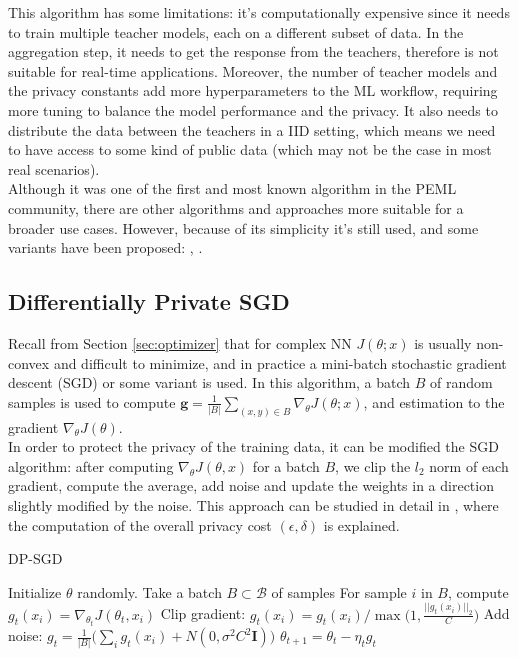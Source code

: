 This algorithm has some limitations: it's computationally expensive since it needs to train multiple teacher models, each on a different subset of data. In the aggregation step, it needs to get the response from the teachers, therefore is not suitable for real-time applications.
Moreover, the number of teacher models and the privacy constants add more hyperparameters to the ML workflow, requiring more tuning to balance the model performance and the privacy. It also needs to distribute the data between the teachers in a IID setting, which means we need to have access to some kind of public data (which may not be the case in most real scenarios).\\
Although it was one of the first and most known algorithm in the PEML community, there are other algorithms and approaches more suitable for a broader use cases. However, because of its simplicity it's still used, and some variants have been proposed: \cite{long}, \cite{jordon2019}.

\subsection{Differentially Private SGD}
Recall from Section \ref{sec:optimizer} that for complex NN $J(\theta; x)$ is usually non-convex and difficult to minimize, and in practice a mini-batch stochastic gradient descent (SGD) or some variant is used. In this algorithm, a batch $B$  of random samples is used to compute $\mathbf{g} = \frac{1}{|B|} \sum_{(x,y) \in B} \nabla_\theta J(\theta; x)$, and estimation to the gradient $\nabla_\theta J(\theta)$.\\
In order to protect the privacy of the training data, it can be modified the SGD algorithm: after computing $\nabla_\theta J(\theta, x)$ for a batch $B$, we clip the $l_2$ norm of each gradient, compute the average, add noise and update the weights in a direction slightly modified by the noise. This approach can be studied in detail in \cite{abadi2016}, where the computation of the overall privacy cost $(\epsilon, \delta)$ is explained.


\begin{algorithm}[H]
  \caption{DP-SGD}
  \label{alg:DP_SGD}
  \begin{algorithmic}[1]
    \State Initialize $\theta$ randomly.
      \State Take a batch $B \subset \mathcal{B}$ of samples
      \State For sample $i$ in $B$, compute $g_t(x_i) = \nabla_{\theta_t} J(\theta_t, x_i)$
      \State Clip gradient: $g_t(x_i) = g_t(x_i)/\max \bigl( 1, \frac{||g_t(x_i)||_2}{C} \bigr)$
      \State Add noise: $g_t = \frac{1}{|B|} \bigl( \sum_i g_t(x_i) + N(0, \sigma^2 C^2 \boldsymbol{I}) \bigr)$
      \State $\theta_{t+1} = \theta_t - \eta_t g_t$
    \EndFor
  \end{algorithmic}
\end{algorithm}

